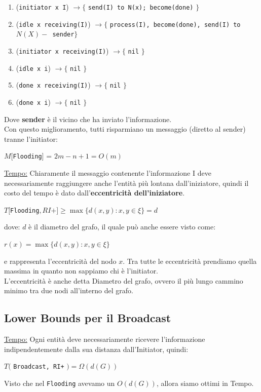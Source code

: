 \begin{enumerate}
  \item (\texttt{initiator x I}) $\rightarrow \lbrace$ \texttt{send(I) to N(x); become(done)} $\rbrace$
  \item (\texttt{idle x receiving(I)}) $\rightarrow \lbrace$ \texttt{process(I), become(done), send(I) to $N(X) -$ {sender}}$\rbrace$
  \item (\texttt{initiator x receiving(I)}) $\rightarrow \lbrace$ \texttt{nil} $\rbrace$
  \item (\texttt{idle x i}) $\rightarrow \lbrace$ \texttt{nil} $\rbrace$
  \item (\texttt{done x receiving(I)}) $\rightarrow \lbrace$ \texttt{nil} $\rbrace$
  \item (\texttt{done x i}) $\rightarrow \lbrace$ \texttt{nil} $\rbrace$
\end{enumerate}
Dove \textbf{sender} è il vicino che ha inviato l'informazione.\\
Con questo miglioramento, tutti risparmiano un messaggio (diretto al sender) tranne l'initiator:
\begin{center}
  $M[$\texttt{Flooding}] = $2m-n+1=O(m)$
\end{center}

\underline{Tempo:}
Chiaramente il messaggio contenente l'informazione I deve necessariamente raggiungere anche l'entità più lontana dall'iniziatore, quindi il costo del tempo è dato dall'\textbf{eccentricità dell'iniziatore}.
\begin{center}
  $T[$\texttt{Flooding}$, RI+] \geq \max \lbrace d(x,y) : x, y \in \xi \rbrace = d$
\end{center}
dove: $d$ è il diametro del grafo, il quale può anche essere visto come:
\begin{center}
  $r(x) = \max \lbrace d(x, y) : x, y \in \xi \rbrace$
\end{center}
e rappresenta l'eccentricità del nodo $x$. Tra tutte le eccentricità prendiamo quella massima in quanto non sappiamo chi è l'initiator.\\
L'eccentricità è anche detta Diametro del grafo, ovvero il più lungo cammino minimo tra due nodi all'interno del grafo.

\subsection{Lower Bounds per il Broadcast}
\underline{Tempo:}
Ogni entità deve necessariamente ricevere l'informazione indipendentemente dalla sua distanza dall'Initiator, quindi:
\begin{center}
  $T($ \texttt{Broadcast, RI+} $) = \Omega(d(G))$
\end{center}
Visto che nel \texttt{Flooding} avevamo un $O(d(G))$, allora siamo ottimi in Tempo.

